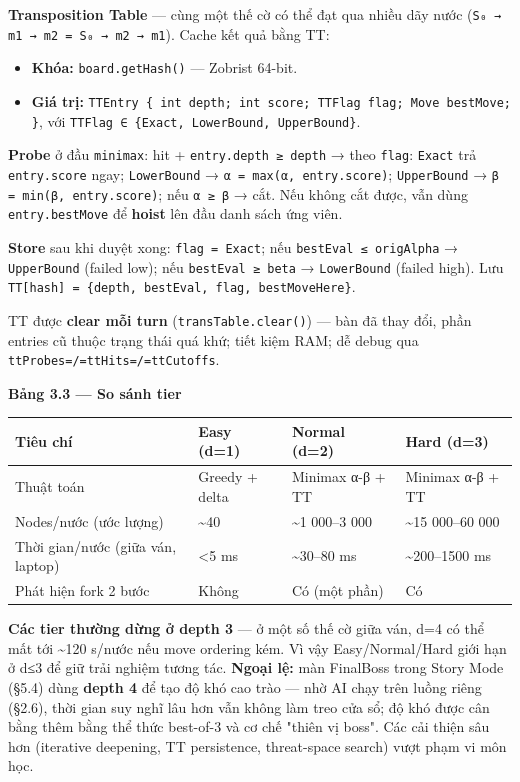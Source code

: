 \documentclass[11pt,a4paper]{article}
\begin{document}
\textbf{Transposition Table} — cùng một thế cờ có thể đạt qua nhiều dãy nước (\texttt{S₀ → m1 → m2 = S₀ → m2 → m1}). Cache kết quả bằng TT:

\begin{itemize}
\item \textbf{Khóa:} \texttt{board.getHash()} — Zobrist 64-bit.
\item \textbf{Giá trị:} \texttt{TTEntry \{ int depth; int score; TTFlag flag; Move bestMove; \}}, với \texttt{TTFlag ∈ \{Exact, LowerBound, UpperBound\}}.
\end{itemize}

\textbf{Probe} ở đầu \texttt{minimax}: hit + \texttt{entry.depth ≥ depth} → theo \texttt{flag}: \texttt{Exact} trả \texttt{entry.score} ngay; \texttt{LowerBound} → \texttt{α = max(α, entry.score)}; \texttt{UpperBound} → \texttt{β = min(β, entry.score)}; nếu \texttt{α ≥ β} → cắt. Nếu không cắt được, vẫn dùng \texttt{entry.bestMove} để \textbf{hoist} lên đầu danh sách ứng viên.

\textbf{Store} sau khi duyệt xong: \texttt{flag = Exact}; nếu \texttt{bestEval ≤ origAlpha} → \texttt{UpperBound} (failed low); nếu \texttt{bestEval ≥ beta} → \texttt{LowerBound} (failed high). Lưu \texttt{TT[hash] = \{depth, bestEval, flag, bestMoveHere\}}.

TT được \textbf{clear mỗi turn} (\texttt{transTable.clear()}) — bàn đã thay đổi, phần entries cũ thuộc trạng thái quá khứ; tiết kiệm RAM; dễ debug qua \texttt{ttProbes=/=ttHits=/=ttCutoffs}.

\textbf{Bảng 3.3 — So sánh tier}

\begin{center}
\begin{tabularx}{\textwidth}{Xlll}
Tiêu chí & Easy (d=1) & Normal (d=2) & Hard (d=3)\\
\hline
Thuật toán & Greedy + delta & Minimax α-β + TT & Minimax α-β + TT\\
Nodes/nước (ước lượng) & \textasciitilde{}40 & \textasciitilde{}1 000–3 000 & \textasciitilde{}15 000–60 000\\
Thời gian/nước (giữa ván, laptop) & <5 ms & \textasciitilde{}30–80 ms & \textasciitilde{}200–1500 ms\\
Phát hiện fork 2 bước & Không & Có (một phần) & Có\\
\end{tabularx}
\end{center}

\textbf{Các tier thường dừng ở depth 3} — ở một số thế cờ giữa ván, d=4 có thể mất tới \textasciitilde{}120 s/nước nếu move ordering kém. Vì vậy Easy/Normal/Hard giới hạn ở d≤3 để giữ trải nghiệm tương tác. \textbf{Ngoại lệ:} màn FinalBoss trong Story Mode (§5.4) dùng \textbf{depth 4} để tạo độ khó cao trào — nhờ AI chạy trên luồng riêng (§2.6), thời gian suy nghĩ lâu hơn vẫn không làm treo cửa sổ; độ khó được cân bằng thêm bằng thể thức best-of-3 và cơ chế "thiên vị boss". Các cải thiện sâu hơn (iterative deepening, TT persistence, threat-space search) vượt phạm vi môn học.
\end{document}

